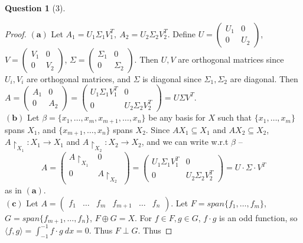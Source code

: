 \documentclass[11pt]{article}
\theoremstyle{quest}
\newtheorem*{question}{Question}
\begin{document}
\begin{question}[3]
\end{question}
\begin{proof}
$\mathbf{(a)}$ Let $A_1 = U_1 \Sigma_1 V_1^T,\ A_2 = U_2 \Sigma_2 V_2^T$. Define $U = \begin{pmatrix}
U_1 & 0 \\
0 & U_2
\end{pmatrix}$, $V = \begin{pmatrix}
V_1 & 0 \\
0 & V_2
\end{pmatrix}$, $\Sigma = \begin{pmatrix}
\Sigma_1 & 0 \\
0 & \Sigma_2
\end{pmatrix}$. Then $U, V$ are orthogonal matrices since $U_i, V_i$ are orthogonal matrices, and $\Sigma$ is diagonal since $\Sigma_1, \Sigma_2$ are diagonal. Then
\\$A = \begin{pmatrix}
A_1 & 0 \\
0 & A_2
\end{pmatrix} = \begin{pmatrix}
U_1 \Sigma_1 V_1^T & 0 \\
0 & U_2 \Sigma_2 V_2^T 
\end{pmatrix} = U \Sigma V^T$.
\\$\mathbf{(b)}$ Let $\beta = \{x_1, \ldots, x_m, x_{m+1}, \ldots, x_n\}$ be any basis for $X$ such that $\{x_1, \ldots, x_m\}$ spans $X_1$, and $\{x_{m+1}, \ldots, x_n\}$ spans $X_2$. Since $AX_1 \subseteq X_1$ and $AX_2 \subseteq X_2$, $A \restriction_{X_1} : X_1 \rightarrow X_1$ and $A \restriction_{X_2} : X_2 \rightarrow X_2$, and we can write w.r.t $\beta$ --
$$A =  \begin{pmatrix}
A \restriction_{X_1} & 0 \\
0 & A \restriction_{X_2}
\end{pmatrix} = \begin{pmatrix}
U_1 \Sigma_1 V_1^T & 0 \\
0 & U_2 \Sigma_2 V_2^T
\end{pmatrix} = U \cdot \Sigma \cdot V^T$$
as in $\mathbf{(a)}$.
\\$\mathbf{(c)}$ Let $A = \begin{pmatrix}
f_1 & \ldots & f_m & f_{m+1} & \ldots & f_n
\end{pmatrix}$. Let $F = span \{f_1, \ldots, f_m\}$, $G = span \{f_{m+1}, \ldots, f_n\}$, $F \oplus G = X$. For $f \in F, g \in G$, $f \cdot g$ is an odd function, so $\langle f, g \rangle = \int_{-1}^{-1} f \cdot g\ dx = 0$. Thus $F \perp G$. Thus

\end{proof}
\end{document}
